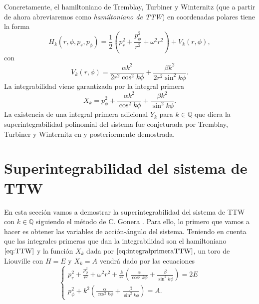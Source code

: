 \documentclass[12pt,a4paper,twoside]{article}
\theoremstyle{definition} \newtheorem{defn}[thm]{Definición}
\theoremstyle{definition} \newtheorem{ejemplo}[thm]{Ejemplo}
\theoremstyle{definition} \newtheorem{ejercicio}[thm]{Ejercicio}
\theoremstyle{remark} \newtheorem*{obs}{Observación}
\def\QQ{\mathbb{Q}}
\begin{document}
Concretamente, el hamiltoniano de Tremblay, Turbiner y Winternitz (que a partir de ahora abreviaremos como \emph{hamiltoniano de TTW}) en coordenadas polares tiene la forma 
\begin{equation}
  H_k(r,\phi,p_r,p_{\phi})=\frac{1}{2}\left( p_r^2+\frac{p^2_{\phi}}{r^2} +\omega^2 r^2 \right) + V_k(r,\phi),
\end{equation}
con
\begin{equation}
  V_k(r,\phi)=\frac{\alpha k^2}{2r^2\cos^2 k\phi}+\frac{\beta k^2}{2r^2\sin^2 k\phi}.
  \label{eq:TTW}
\end{equation}
La integrabilidad viene garantizada por la integral primera
\begin{equation}
  X_k=p_{\phi}^2+\frac{\alpha k^2}{\cos^2 k\phi}+\frac{\beta k^2}{\sin^2 k\phi}.
  \label{eq:integralprimeraTTW}
\end{equation}
La existencia de una integral primera adicional $Y_{k}$ para $k\in \QQ$ que diera la superintegrabilidad polinomial del sistema fue conjeturada por Tremblay, Turbiner y Winternitz en \cite{ttw1} y posteriormente demostrada.

\section{Superintegrabilidad del sistema de TTW}
En esta sección vamos a demostrar la superintegrabilidad del sistema de TTW con $k\in \QQ$ siguiendo el método de C. Gonera \cite{gonera}. Para ello, lo primero que vamos a hacer es obtener las variables de acción-ángulo del sistema. Teniendo en cuenta que las integrales primeras que dan la integrabilidad son el hamiltoniano $\eqref{eq:TTW}$ y la función $X_k$ dada por $\eqref{eq:integralprimeraTTW}$, un toro de Liouville con $H=E$ y $X_k=A$ vendrá dado por las ecuaciones
\begin{equation}
  \begin{cases}
    p_r^2+\frac{p_{\phi}^2}{r^2}+\omega^2r^2 + \frac{k}{r^2}\left( \frac{\alpha}{\cos^2k\phi} +\frac{\beta}{\sin^2k\phi}\right) = 2E \\
    p_{\phi}^2+k^2\left( \frac{\alpha}{\cos^2k\phi} +\frac{\beta}{\sin^2k\phi}\right)=A.
  \end{cases}
\end{equation}
\end{document}
